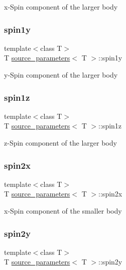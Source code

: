 x-\/\+Spin component of the larger body \mbox{\label{structsource__parameters_aee9a22b3a44293741d68b303f0b40c06}} 
\subsubsection{\texorpdfstring{spin1y}{spin1y}}
{\footnotesize\ttfamily template$<$class T$>$ \\
T \hyperlink{structsource__parameters}{source\+\_\+parameters}$<$ T $>$\+::spin1y}

y-\/\+Spin component of the larger body \mbox{\label{structsource__parameters_a4184da329b8db0612133d4202f5f2769}} 
\subsubsection{\texorpdfstring{spin1z}{spin1z}}
{\footnotesize\ttfamily template$<$class T$>$ \\
T \hyperlink{structsource__parameters}{source\+\_\+parameters}$<$ T $>$\+::spin1z}

z-\/\+Spin component of the larger body \mbox{\label{structsource__parameters_ac5278ad7984fb12f6a0c0277d6c6f25e}} 
\subsubsection{\texorpdfstring{spin2x}{spin2x}}
{\footnotesize\ttfamily template$<$class T$>$ \\
T \hyperlink{structsource__parameters}{source\+\_\+parameters}$<$ T $>$\+::spin2x}

x-\/\+Spin component of the smaller body \mbox{\label{structsource__parameters_a7f457ff3d231ba2f254570a7e09f45f9}} 
\subsubsection{\texorpdfstring{spin2y}{spin2y}}
{\footnotesize\ttfamily template$<$class T$>$ \\
T \hyperlink{structsource__parameters}{source\+\_\+parameters}$<$ T $>$\+::spin2y}

